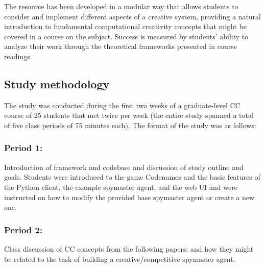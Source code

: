 \documentclass[phd,electronic,oneside,twosidetoc,letterpaper,chaptercenter,parttop,lof]{byumsphd}
\begin{document}
The resource has been developed in a modular way that allows students to consider and implement different aspects of a creative system, providing a natural introduction to fundamental computational creativity concepts that might be covered in a course on the subject. Success is measured by students' ability to analyze their work through the theoretical frameworks presented in course readings. 

\subsection{Study methodology}

The study was conducted during the first two weeks of a graduate-level CC course of 25 students that met twice per week (the entire study spanned a total of five class periods of 75 minutes each).  The format of the study was as follows:

\subsubsection{Period 1:} Introduction of framework and codebase and discussion of study outline and goals.  Students were introduced to the game Codenames and the basic features of the Python client, the example spymaster agent, and the web UI and were instructed on how to modify the provided base spymaster agent or create a new one.

\subsubsection{Period 2:} Class discussion of CC concepts from the following papers: \cite{wiggins2006,ritchie07,ventura2017howto,colton2011,pease2011} and how they might be related to the task of building a creative/competitive spymaster agent.
\end{document}
